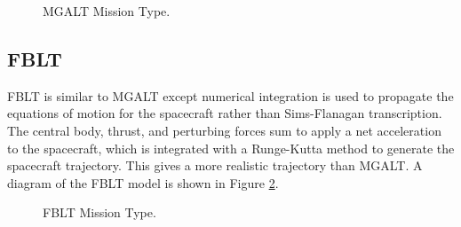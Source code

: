 \documentclass[11pt]{article}
\begin{document}
\begin{figure}[H]
	\centering
	\caption{\label{fig:mgalt_mission_type}\ac{MGALT} Mission Type.}
\end{figure}

\subsection{FBLT}
\label{sec:fblt}

\acf{FBLT} is similar to \ac{MGALT} except numerical integration is used to propagate the equations of motion for the spacecraft rather than Sims-Flanagan transcription. The central body, thrust, and perturbing forces sum to apply a net acceleration to the spacecraft, which is integrated with a Runge-Kutta method to generate the spacecraft trajectory. This gives a more realistic trajectory than \ac{MGALT}. A diagram of the \ac{FBLT} model is shown in Figure \ref{fig:fblt_mission_type}.

\begin{figure}
	\centering
	\caption{\label{fig:fblt_mission_type}\ac{FBLT} Mission Type.}
\end{figure}
\end{document}
